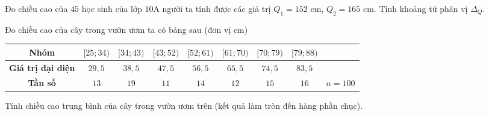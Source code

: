 \begin{ex}%
Đo chiều cao của $45$ học sinh của lớp $10$A người ta tính được các giá trị $Q_1=152$ cm, $Q_2=165$ cm. Tính khoảng tứ phân vị $\Delta _Q$.
\end{ex}

\begin{ex}%
Đo chiều cao của cây trong vườn ươm ta có bảng sau (đơn vị cm)
\begin{center}
\begin{tabular}{|c|c|c|c|c|c|c|c|c|}
\hline
\textbf{Nhóm} & $[25;34)$ & $[34;43)$ & $[43;52)$ & $[52;61)$ & $[61;70)$ & $[70;79)$ & $[79;88)$ & \\
\hline
\textbf{Giá trị đại diện} & $29{,}5$ & $38{,}5$ & $47{,}5$ & $56{,}5$ & $65{,}5$ & $74{,}5$ & $83{,}5$ & \\
\hline
\textbf{Tần số} & $13$ & $19$ & $11$ & $14$ & $12$ & $15$ & $16$ & $n=100$\\
\hline
\end{tabular}
\end{center}
Tính chiều cao trung bình của cây trong vườn ươm trên (kết quả làm tròn đến hàng phần chục).
\end{ex}

